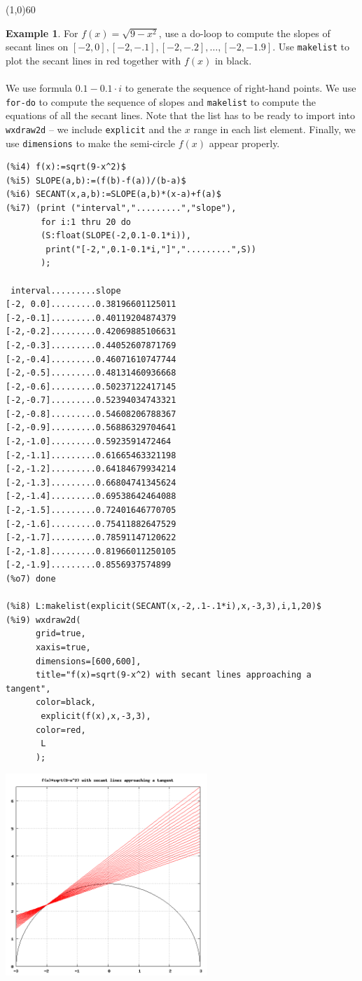 \documentclass[10.5pt,twoside]{report}
\theoremstyle{definition}
\newtheorem{exmp}{Example}[section]
\begin{document}
\line(1,0){60}
\linethickness{0.5mm}


\begin{exmp}  For $f(x)=\sqrt{9-x^2}$, use a do-loop to compute the slopes of secant lines on $[-2,0],[-2,-.1],[-2,-.2],\dots,[-2,-1.9]$.  Use \verb|makelist| to plot the secant lines in red together with $f(x)$ in black.\\
${}$\\

We use formula $0.1-0.1\cdot i$ to generate the sequence of right-hand points.  We use \verb|for-do| to compute the sequence of slopes and \verb|makelist| to compute the equations of all the secant lines.  Note that the list has to be ready to import into \verb|wxdraw2d| -- we include \verb|explicit| and the $x$ range in each list element.  Finally, we use \verb|dimensions| to make the semi-circle $f(x)$ appear properly. 

\begin{verbatim}
(%i4) f(x):=sqrt(9-x^2)$
(%i5) SLOPE(a,b):=(f(b)-f(a))/(b-a)$
(%i6) SECANT(x,a,b):=SLOPE(a,b)*(x-a)+f(a)$
(%i7) (print ("interval",".........","slope"),
       for i:1 thru 20 do
       (S:float(SLOPE(-2,0.1-0.1*i)),
        print("[-2,",0.1-0.1*i,"]",".........",S))
       );
       
 interval.........slope
[-2, 0.0].........0.38196601125011
[-2,-0.1].........0.40119204874379
[-2,-0.2].........0.42069885106631
[-2,-0.3].........0.44052607871769
[-2,-0.4].........0.46071610747744
[-2,-0.5].........0.48131460936668
[-2,-0.6].........0.50237122417145
[-2,-0.7].........0.52394034743321
[-2,-0.8].........0.54608206788367
[-2,-0.9].........0.56886329704641
[-2,-1.0].........0.5923591472464
[-2,-1.1].........0.61665463321198
[-2,-1.2].........0.64184679934214
[-2,-1.3].........0.66804741345624
[-2,-1.4].........0.69538642464088
[-2,-1.5].........0.72401646770705
[-2,-1.6].........0.75411882647529
[-2,-1.7].........0.78591147120622
[-2,-1.8].........0.81966011250105
[-2,-1.9].........0.8556937574899
(%o7) done

(%i8) L:makelist(explicit(SECANT(x,-2,.1-.1*i),x,-3,3),i,1,20)$
(%i9) wxdraw2d(
      grid=true,
      xaxis=true,
      dimensions=[600,600],
      title="f(x)=sqrt(9-x^2) with secant lines approaching a tangent",
      color=black,
       explicit(f(x),x,-3,3),
      color=red,
       L
      );
\end{verbatim}


\includegraphics[width=3in]{example_4_1_2}


\end{exmp}
\end{document}
